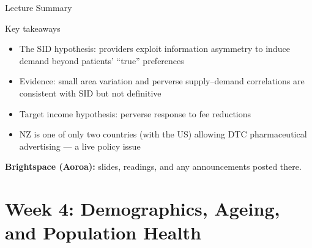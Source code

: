 \documentclass[aspectratio=169, 12pt]{beamer}
\newcommand{\summaryside}[1]{%
  \begin{frame}{Lecture Summary}
    \begin{exampleblock}{Key takeaways}
      \begin{itemize}#1\end{itemize}
    \end{exampleblock}
    \vspace{0.5em}
    {\footnotesize\textcolor{OtagoGold}{\textbf{Brightspace (Aoroa):}} slides, readings, and any announcements posted there.}
  \end{frame}}
\begin{document}
\summaryside{
  \item The SID hypothesis: providers exploit information asymmetry to induce demand beyond patients' ``true'' preferences
  \item Evidence: small area variation and perverse supply--demand correlations are consistent with SID but not definitive
  \item Target income hypothesis: perverse response to fee reductions
  \item NZ is one of only two countries (with the US) allowing DTC pharmaceutical advertising --- a live policy issue
}



\section{Week 4: Demographics, Ageing, and Population Health}
\end{document}
